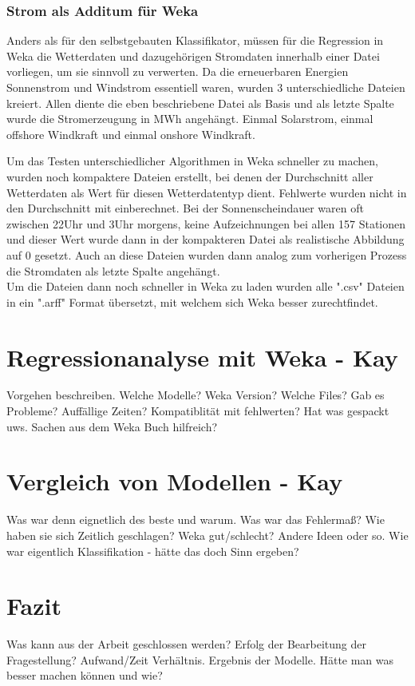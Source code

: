 \documentclass[letterpaper]{article} %
\begin{document}
        \subsubsection*{Strom als Additum für Weka}
            Anders als für den selbstgebauten Klassifikator, müssen für die Regression in Weka die Wetterdaten und dazugehörigen Stromdaten innerhalb einer Datei vorliegen, um sie sinnvoll zu verwerten. Da die erneuerbaren Energien Sonnenstrom und Windstrom essentiell waren, wurden 3 unterschiedliche Dateien kreiert. Allen diente die eben beschriebene Datei als Basis und als letzte Spalte wurde die Stromerzeugung in MWh angehängt. Einmal Solarstrom, einmal offshore Windkraft und einmal onshore Windkraft.

            Um das Testen unterschiedlicher Algorithmen in Weka schneller zu machen, wurden noch kompaktere Dateien erstellt, bei denen der Durchschnitt aller Wetterdaten als Wert für diesen Wetterdatentyp dient. Fehlwerte wurden nicht in den Durchschnitt mit einberechnet. Bei der Sonnenscheindauer waren oft zwischen 22Uhr und 3Uhr morgens, keine Aufzeichnungen bei allen 157 Stationen und dieser Wert wurde dann in der kompakteren Datei als realistische Abbildung auf 0 gesetzt.
            Auch an diese Dateien wurden dann analog zum vorherigen Prozess die Stromdaten als letzte Spalte angehängt.
        \\

        Um die Dateien dann noch schneller in Weka zu laden wurden alle ".csv" Dateien in ein ".arff" Format übersetzt, mit welchem sich Weka besser zurechtfindet.

\section*{Regressionanalyse mit Weka - Kay}
    Vorgehen beschreiben. Welche Modelle? Weka Version? Welche Files? Gab es Probleme? Auffällige Zeiten? Kompatiblität mit fehlwerten? Hat was gespackt uws. Sachen aus dem Weka Buch hilfreich?
\section*{Vergleich von Modellen - Kay}
    Was war denn eignetlich des beste und warum. Was war das Fehlermaß? Wie haben sie sich Zeitlich geschlagen? Weka gut/schlecht? Andere Ideen oder so. Wie war eigentlich Klassifikation - hätte das doch Sinn ergeben?
\section*{Fazit}
    Was kann aus der Arbeit geschlossen werden? Erfolg der Bearbeitung der Fragestellung? Aufwand/Zeit Verhältnis. Ergebnis der Modelle. Hätte man was besser machen können und wie?
    

\end{document}
